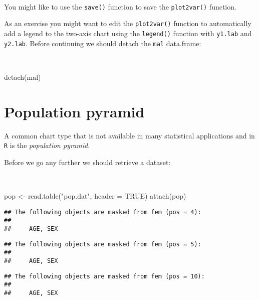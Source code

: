 \documentclass[
  12pt,
  a4paper]{book}
\newenvironment{Shaded}{\begin{snugshade}}{\end{snugshade}}
\newcommand{\AttributeTok}[1]{\textcolor[rgb]{0.77,0.63,0.00}{#1}}
\newcommand{\ConstantTok}[1]{\textcolor[rgb]{0.00,0.00,0.00}{#1}}
\newcommand{\FunctionTok}[1]{\textcolor[rgb]{0.00,0.00,0.00}{#1}}
\newcommand{\NormalTok}[1]{#1}
\newcommand{\OtherTok}[1]{\textcolor[rgb]{0.56,0.35,0.01}{#1}}
\newcommand{\StringTok}[1]{\textcolor[rgb]{0.31,0.60,0.02}{#1}}
\begin{document}
~

You might like to use the \texttt{save()} function to save the \texttt{plot2var()} function.

As an exercise you might want to edit the \texttt{plot2var()} function to automatically add a legend to the two-axis
chart using the \texttt{legend()} function with \texttt{y1.lab} and \texttt{y2.lab}. Before continuing we should detach the \texttt{mal} data.frame:

~

\begin{Shaded}
\begin{Highlighting}[]
\FunctionTok{detach}\NormalTok{(mal)}
\end{Highlighting}
\end{Shaded}

\hypertarget{population-pyramid}{%
\section{Population pyramid}\label{population-pyramid}}

A common chart type that is not available in many statistical applications and in \texttt{R} is the \emph{population pyramid}.

Before we go any further we should retrieve a dataset:

~

\begin{Shaded}
\begin{Highlighting}[]
\NormalTok{pop }\OtherTok{\textless{}{-}} \FunctionTok{read.table}\NormalTok{(}\StringTok{"pop.dat"}\NormalTok{, }\AttributeTok{header =} \ConstantTok{TRUE}\NormalTok{)}
\FunctionTok{attach}\NormalTok{(pop)}
\end{Highlighting}
\end{Shaded}

\begin{verbatim}
## The following objects are masked from fem (pos = 4):
## 
##     AGE, SEX
\end{verbatim}

\begin{verbatim}
## The following objects are masked from fem (pos = 5):
## 
##     AGE, SEX
\end{verbatim}

\begin{verbatim}
## The following objects are masked from fem (pos = 10):
## 
##     AGE, SEX
\end{verbatim}
\end{document}
